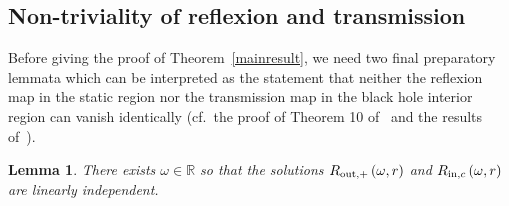 \documentclass[A4,10pt]{article}
\newtheorem{lemma}{Lemma}[subsection]
\begin{document}
\subsection{Non-triviality of reflexion and transmission}\label{nontrivial}

Before giving the proof of Theorem~\ref{mainresult}, we need two final preparatory lemmata which can be interpreted as the statement that neither the reflexion map in the static region nor the transmission map in the black hole interior
region can vanish identically (cf.~the proof of Theorem 10 
of~\cite{Dafermos:2014jwa} and the results of~\cite{kehle}).

\begin{lemma}\label{unique1}There exists $\omega \in \mathbb{R}$ so that the solutions $R_{{\rm out},+}\left(\omega,r\right)$ and $R_{{\rm in},c}\left(\omega,r\right)$ are linearly independent. 

\end{lemma}
\end{document}
